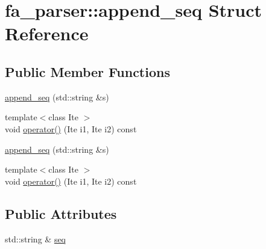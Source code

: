 \hypertarget{structfa__parser_1_1append__seq}{\section{fa\+\_\+parser\+:\+:append\+\_\+seq Struct Reference}
\label{structfa__parser_1_1append__seq}
}
\subsection*{Public Member Functions}
\begin{DoxyCompactItemize}
\item 
\hyperlink{structfa__parser_1_1append__seq_ac4014e74c64af13d65fcffc3258704bd}{append\+\_\+seq} (std\+::string \&s)
\item 
{\footnotesize template$<$class Ite $>$ }\\void \hyperlink{structfa__parser_1_1append__seq_acc924c9cafca4e4380a066d897c19fa6}{operator()} (Ite i1, Ite i2) const 
\item 
\hyperlink{structfa__parser_1_1append__seq_ac4014e74c64af13d65fcffc3258704bd}{append\+\_\+seq} (std\+::string \&s)
\item 
{\footnotesize template$<$class Ite $>$ }\\void \hyperlink{structfa__parser_1_1append__seq_acc924c9cafca4e4380a066d897c19fa6}{operator()} (Ite i1, Ite i2) const 
\end{DoxyCompactItemize}
\subsection*{Public Attributes}
\begin{DoxyCompactItemize}
\item 
std\+::string \& \hyperlink{structfa__parser_1_1append__seq_a0354ac97946d852a422bdcc0a5e52a2d}{seq}
\end{DoxyCompactItemize}


